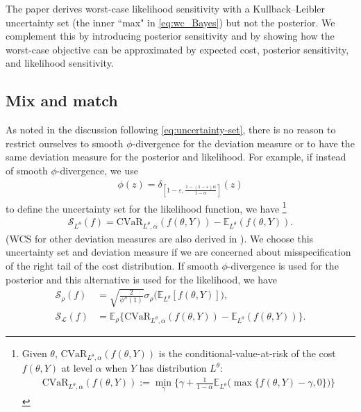 \documentclass[11pt,reqno,letter]{amsart}
\theoremstyle{plain}
\theoremstyle{definition}
\numberwithin{equation}{section}
\numberwithin{theorem}{section}
\numberwithin{table}{section}
\numberwithin{figure}{section}
\begin{document}
The paper \cite{shapiro2023bayesian} derives worst-case likelihood sensitivity  with a Kullback--Leibler uncertainty set (the inner ``max" in \eqref{eq:wc_Bayes}) but not the posterior. We complement this by introducing posterior sensitivity and by showing how the worst-case objective can be approximated by  expected cost, posterior sensitivity, and likelihood sensitivity.


\subsection{Mix and match}
\label{sec:mix}

As noted in the discussion following \eqref{eq:uncertainty-set}, there is no reason to restrict ourselves to smooth $\phi$-divergence for the deviation measure or to have the same deviation measure for the posterior and likelihood. For example, if instead of smooth $\phi$-divergence, we use 
\begin{eqnarray*}
\phi(z)=\delta_{[1-\varepsilon,\frac{1-(1-\varepsilon)\alpha}{1-\alpha}]}(z)
\end{eqnarray*} 
to define the uncertainty set for the likelihood function, we have \cite{gotoh2026sensitivity}\footnote{Given $\theta$, $\mathrm{CVaR}_{L^\theta,\alpha}(f(\theta, Y))$ is the conditional-value-at-risk of the cost $f(\theta, Y)$ at level $\alpha$ when $Y$ has distribution $L^\theta$: \begin{eqnarray*}\mathrm{CVaR}_{L^\theta,\alpha}(f(\theta, Y)):=\min_\gamma\Big\{\gamma+\frac{1}{1-\alpha}\mathbb{E}_{L^\theta}\Big(\max\big\{f(\theta, Y)-\gamma,0\big\}\Big)\Big\}\end{eqnarray*}}
\begin{eqnarray*} 
{\mathcal S}_{L^\theta}(f) = \mathrm{CVaR}_{L^\theta,\alpha}(f(\theta, Y))-\mathbb{E}_{L^\theta} (f(\theta, Y)).
\end{eqnarray*} 
(WCS for other deviation measures are also derived in \cite{gotoh2026sensitivity}). We choose this uncertainty set and deviation measure if we are concerned about misspecification of the right tail of the cost distribution. 
If smooth $\phi$-divergence is used for the posterior and this alternative is used for the likelihood, we have
\begin{align*}
{\mathcal S}_{\rho}(f) &= \sqrt{\frac{2}{\phi''(1)}}{\sigma}_\rho\Big({\mathbb E}_{L^\theta}[f(\theta, Y)]\Big), \\[5pt]
{\mathcal S}_{\mathcal L}(f) & = {\mathbb E}_\rho \Big\{\mathrm{CVaR}_{L^\theta, \alpha}(f(\theta, Y))-\mathbb{E}_{L^\theta} (f(\theta, Y))\Big\}.
\end{align*}
\end{document}
